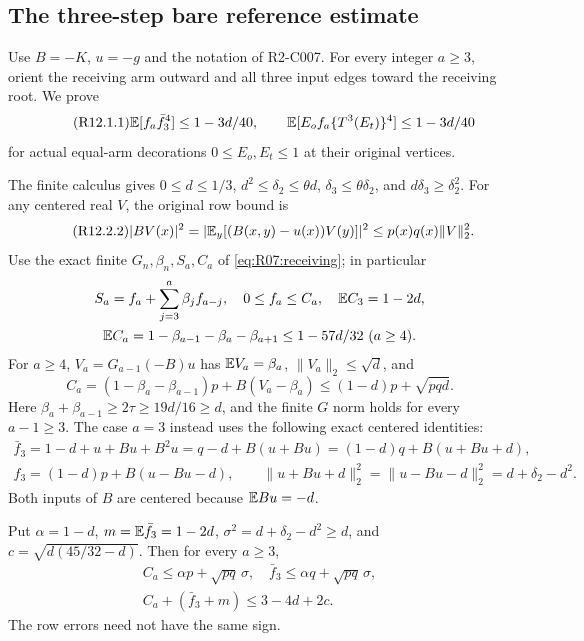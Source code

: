 \subsection{The three-step bare reference estimate}\label{proof:R2-C012}
Use $B=-K$, $u=-g$ and the notation of R2-C007.
For every integer $a\ge3$, orient the receiving arm outward and all
three input edges toward the receiving root. We prove
\begin{equation}\tag{R12.1.1}\label{eq:R12:claim}
 \mathbb E[f_a\bar f_3^4]\le1-3d/40,
 \qquad
 \mathbb E[E_of_a\{T^3(E_t)\}^4]\le1-3d/40
\end{equation}
for actual equal-arm decorations $0\le E_o,E_t\le1$ at their original
vertices.

The finite calculus gives
$0\le d\le1/3$, $d^2\le\delta_2\le\theta d$,
$\delta_3\le\theta\delta_2$, and $d\delta_3\ge\delta_2^2$.
For any centered real $V$, the original row bound is
\begin{equation}\tag{R12.2.2}\label{eq:R12:row}
 |BV(x)|^2
 =|\mathbb E_y[(B(x,y)-u(x))V(y)]|^2\le p(x)q(x)\|V\|_2^2.
\end{equation}
Use the exact finite $G_n,\beta_n,S_a,C_a$ of
\eqref{eq:R07:receiving}; in particular
\[
\begin{gathered}
S_a=f_a+\sum_{j=3}^a\beta_jf_{a-j},\quad 0\le f_a\le C_a,\quad \mathbb E C_3=1-2d,\\
\mathbb E C_a=1-\beta_{a-1}-\beta_a-\beta_{a+1}\le1-57d/32\ (a\ge4).
\end{gathered}
\]
For $a\ge4$, $V_a=G_{a-1}(-B)u$ has $\mathbb E V_a=\beta_a$,
$\|V_a\|_2\le\sqrt d$, and
\[
C_a=(1-\beta_a-\beta_{a-1})p+B(V_a-\beta_a)
\le(1-d)p+\sqrt{pqd}.
\]
Here $\beta_a+\beta_{a-1}\ge2\tau\ge19d/16\ge d$, and the finite
$G$ norm holds for every $a-1\ge3$. The case $a=3$ instead uses the
following exact centered identities:
\begin{equation}\tag{R12.3.3}\label{eq:R12:centered}
\begin{gathered}
\bar f_3=1-d+u+Bu+B^2u=q-d+B(u+Bu)
       =(1-d)q+B(u+Bu+d),\\
f_3=(1-d)p+B(u-Bu-d),\qquad
\|u+Bu+d\|_2^2=\|u-Bu-d\|_2^2=d+\delta_2-d^2.
\end{gathered}
\end{equation}
Both inputs of $B$ are centered because $\mathbb E Bu=-d$.

Put $\alpha=1-d$, $m=\mathbb E\bar f_3=1-2d$,
$\sigma^2=d+\delta_2-d^2\ge d$, and
$c=\sqrt{d(45/32-d)}$. Then for every $a\ge3$,
\begin{equation}\tag{R12.3.6}\label{eq:R12:pointwise}
\begin{gathered}
C_a\le\alpha p+\sqrt{pq}\,\sigma,\quad \bar f_3\le\alpha q+\sqrt{pq}\,\sigma,\\
C_a+(\bar f_3+m)\le3-4d+2c.
\end{gathered}
\end{equation}
The row errors need not have the same sign.

